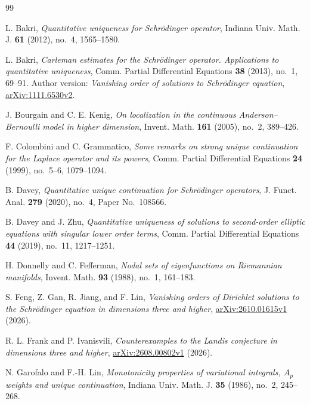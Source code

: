 \documentclass[11pt,twoside,leqno]{article}
\numberwithin{equation}{section}
\theoremstyle{definition}
\theoremstyle{remark}
\begin{document}
\begin{thebibliography}{99}
\small
\setlength{\itemsep}{3pt plus 1pt}
\setlength{\parskip}{0pt}

L. Bakri, \emph{Quantitative uniqueness for Schr\"odinger operator},
Indiana Univ. Math. J. \textbf{61} (2012), no.~4, 1565--1580.

L. Bakri, \emph{Carleman estimates for the Schr\"odinger operator.
Applications to quantitative uniqueness},
Comm. Partial Differential Equations \textbf{38} (2013), no.~1, 69--91.
Author version: \emph{Vanishing order of solutions to Schr\"odinger equation},
\href{https://arxiv.org/abs/1111.6530v2}{arXiv:1111.6530v2}.

J. Bourgain and C. E. Kenig,
\emph{On localization in the continuous Anderson--Bernoulli model
in higher dimension}, Invent. Math. \textbf{161} (2005), no.~2, 389--426.

F. Colombini and C. Grammatico,
\emph{Some remarks on strong unique continuation for the Laplace
operator and its powers},
Comm. Partial Differential Equations \textbf{24} (1999), no.~5--6,
1079--1094.

B. Davey, \emph{Quantitative unique continuation for Schr\"odinger operators},
J. Funct. Anal. \textbf{279} (2020), no.~4, Paper No.~108566.

B. Davey and J. Zhu,
\emph{Quantitative uniqueness of solutions to second-order elliptic
equations with singular lower order terms},
Comm. Partial Differential Equations \textbf{44} (2019), no.~11, 1217--1251.

H. Donnelly and C. Fefferman,
\emph{Nodal sets of eigenfunctions on Riemannian manifolds},
Invent. Math. \textbf{93} (1988), no.~1, 161--183.

S. Feng, Z. Gan, R. Jiang, and F. Lin,
\emph{Vanishing orders of Dirichlet solutions to the Schr\"odinger equation
in dimensions three and higher},
\href{https://arxiv.org/abs/2610.01615v1}{arXiv:2610.01615v1} (2026).

R. L. Frank and P. Ivanisvili,
\emph{Counterexamples to the Landis conjecture in dimensions three and higher},
\href{https://arxiv.org/abs/2608.00802v1}{arXiv:2608.00802v1} (2026).

N. Garofalo and F.-H. Lin,
\emph{Monotonicity properties of variational integrals, $A_p$ weights
and unique continuation},
Indiana Univ. Math. J. \textbf{35} (1986), no.~2, 245--268.


\end{thebibliography}
\end{document}
